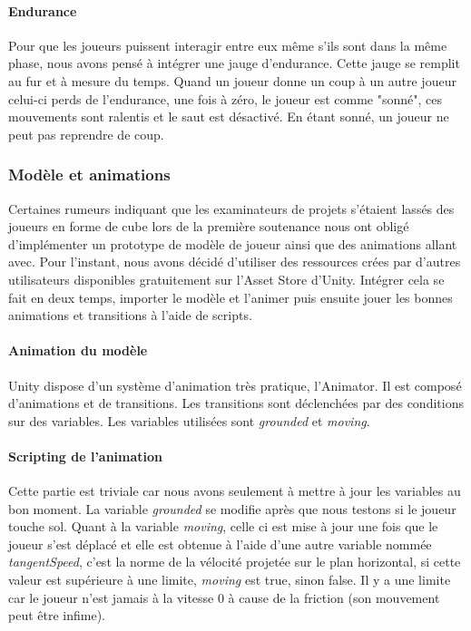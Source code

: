 \documentclass{article}
\begin{document}
\paragraph{Endurance}

Pour que les joueurs puissent interagir entre eux même s'ils sont dans la même phase, nous avons pensé à intégrer une jauge d'endurance. Cette jauge se remplit au fur et à mesure du temps. Quand un joueur donne un coup à un autre joueur celui-ci perds de l'endurance, une fois à zéro, le joueur est comme "sonné", ces mouvements sont ralentis et le saut est désactivé. En étant sonné, un joueur ne peut pas reprendre de coup.


\subsubsection{Modèle et animations}

Certaines rumeurs indiquant que les examinateurs de projets s'étaient lassés des joueurs en forme de cube lors de la première soutenance nous ont obligé d'implémenter un prototype de modèle de joueur ainsi que des animations allant avec. Pour l'instant, nous avons décidé d'utiliser des ressources crées par d'autres utilisateurs disponibles gratuitement sur l'Asset Store d'Unity. Intégrer cela se fait en deux temps, importer le modèle et l'animer puis ensuite jouer les bonnes animations et transitions à l'aide de scripts.

\paragraph{Animation du modèle}

Unity dispose d'un système d'animation très pratique, l'Animator. Il est composé d'animations et de transitions. Les transitions sont déclenchées par des conditions sur des variables. Les variables utilisées sont \emph{grounded} et \emph{moving}.



\paragraph{Scripting de l'animation}

Cette partie est triviale car nous avons seulement à mettre à jour les variables au bon moment. La variable \emph{grounded} se modifie après que nous testons si le joueur touche sol. Quant à la variable \emph{moving}, celle ci est mise à jour une fois que le joueur s'est déplacé et elle est obtenue à l'aide d'une autre variable nommée \emph{tangentSpeed}, c'est la norme de la vélocité projetée sur le plan horizontal, si cette valeur est supérieure à une limite, \emph{moving} est true, sinon false. Il y a une limite car le joueur n'est jamais à la vitesse 0 à cause de la friction (son mouvement peut être infime).
\end{document}
